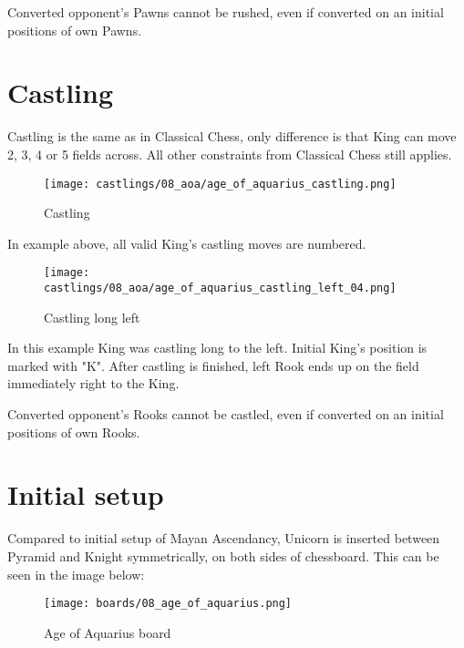 Converted opponent's Pawns cannot be rushed, even if converted on an initial positions
of own Pawns.

\clearpage %

\section*{Castling}

Castling is the same as in Classical Chess, only difference is that King can move 2, 3, 4 or 5 fields across.
All other constraints from Classical Chess still applies.

\noindent
\begin{figure}[!h]
\texttt{[image: castlings/08\_aoa/age\_of\_aquarius\_castling.png]}
\caption{Castling}
\label{fig:age_of_aquarius_castling}
\end{figure}

In example above, all valid King's castling moves are numbered.

\noindent
\begin{figure}[!h]
\texttt{[image: castlings/08\_aoa/age\_of\_aquarius\_castling\_left\_04.png]}
\caption{Castling long left}
\label{fig:age_of_aquarius_castling_left_04}
\end{figure}

In this example King was castling long to the left. Initial King's position is marked with "K".
After castling is finished, left Rook ends up on the field immediately right to the King.

Converted opponent's Rooks cannot be castled, even if converted on an initial positions
of own Rooks.

\clearpage %

\section*{Initial setup}

Compared to initial setup of Mayan Ascendancy, Unicorn is inserted between Pyramid and Knight
symmetrically, on both sides of chessboard. This can be seen in the image below:

\noindent
\begin{figure}[h]
\texttt{[image: boards/08\_age\_of\_aquarius.png]}
\caption{Age of Aquarius board}
\label{fig:08_age_of_aquarius}
\end{figure}

\clearpage %

